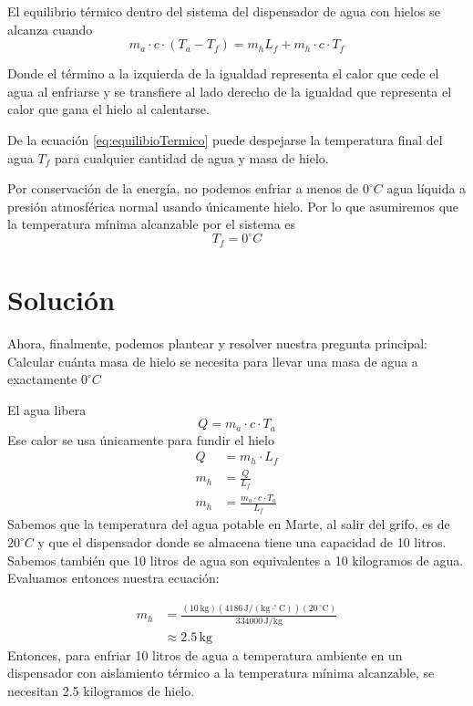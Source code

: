 \documentclass[12pt]{article}
\begin{document}
El equilibrio térmico dentro del sistema del dispensador de agua con hielos se alcanza cuando
\begin{equation}
  m_a \cdot c \cdot (T_a - T_f) = m_h L_f + m_h \cdot c \cdot T_f
  \label{eq:equilibioTermico}
\end{equation}

Donde el término a la izquierda de la igualdad representa el calor que cede el agua al enfriarse y se transfiere al lado derecho de la igualdad que representa 
el calor que gana el hielo al calentarse.

De la ecuación \eqref{eq:equilibioTermico} puede despejarse la temperatura final del agua $T_f$ para cualquier 
cantidad de agua y masa de hielo.

Por conservación de la energía, no podemos enfriar a menos de $0^\circ C$ agua líquida a presión atmosférica normal usando únicamente hielo.
Por lo que asumiremos que la temperatura mínima alcanzable por el sistema es 
\[ T_f = 0^\circ C \]

\section{Solución}
Ahora, finalmente, podemos plantear y resolver nuestra pregunta principal:
Calcular cuánta masa de hielo se necesita para llevar una masa de agua a exactamente $0^\circ C$

El agua libera 
\begin{equation}
  Q = m_a \cdot c \cdot T_a
  \label{eq:calorAgua}
\end{equation}
Ese calor se usa únicamente para fundir el hielo
\begin{align}
  Q &= m_h \cdot L_f \\
  m_h &= \frac{Q}{L_f} \\
  m_h &= \frac{m_a \cdot c \cdot T_a}{L_f}
  \label{eq:fundicionHielo}
\end{align}
Sabemos que la temperatura del agua potable en Marte, al salir del grifo, es de $20^\circ C$ y que el dispensador
donde se almacena tiene una capacidad de 10 litros.
Sabemos también que 10 litros de agua son equivalentes a 10 kilogramos de agua.
Evaluamos entonces nuestra ecuación:

\begin{equation}
\begin{aligned}
m_h &=
\frac{
(10\,\mathrm{kg})
(4186\,\mathrm{J/(kg\cdot ^\circ C)})
(20\,^\circ\mathrm{C})
}{
334000\,\mathrm{J/kg}
} \\
&\approx 2.5\,\mathrm{kg}
\end{aligned}
\label{eq:calculoMasaHielo}
\end{equation}
Entonces, para enfriar 10 litros de agua a temperatura ambiente en un dispensador con aislamiento térmico a la temperatura mínima
alcanzable, se necesitan 2.5 kilogramos de hielo.
\end{document}
